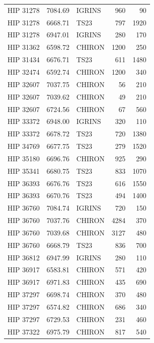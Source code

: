 \begin{scriptsize}
\begin{longtable}{|l|rlrr|}
   HIP 31278 &  7084.69 &     IGRINS &      960 &    90 \\
   HIP 31278 &  6668.71 &       TS23 &      797 &  1920 \\
   HIP 31278 &  6947.01 &     IGRINS &      280 &   170 \\
   HIP 31362 &  6598.72 &     CHIRON &     1200 &   250 \\
   HIP 31434 &  6676.71 &       TS23 &      611 &  1480 \\
   HIP 32474 &  6592.74 &     CHIRON &     1200 &   340 \\
   HIP 32607 &  7037.75 &     CHIRON &       56 &   210 \\
   HIP 32607 &  7039.62 &     CHIRON &       49 &   210 \\
   HIP 32607 &  6724.56 &     CHIRON &       67 &   560 \\
   HIP 33372 &  6948.00 &     IGRINS &      320 &   110 \\
   HIP 33372 &  6678.72 &       TS23 &      720 &  1380 \\
   HIP 34769 &  6677.75 &       TS23 &      279 &  1520 \\
   HIP 35180 &  6696.76 &     CHIRON &      925 &   290 \\
   HIP 35341 &  6680.75 &       TS23 &      833 &  1070 \\
   HIP 36393 &  6676.76 &       TS23 &      616 &  1550 \\
   HIP 36393 &  6670.76 &       TS23 &      494 &  1400 \\
   HIP 36760 &  7084.74 &     IGRINS &      720 &   150 \\
   HIP 36760 &  7037.76 &     CHIRON &     4284 &   370 \\
   HIP 36760 &  7039.68 &     CHIRON &     3127 &   480 \\
   HIP 36760 &  6668.79 &       TS23 &      836 &   700 \\
   HIP 36812 &  6947.99 &     IGRINS &      280 &   110 \\
   HIP 36917 &  6583.81 &     CHIRON &      571 &   420 \\
   HIP 36917 &  6971.83 &     CHIRON &      435 &   690 \\
   HIP 37297 &  6698.74 &     CHIRON &      370 &   480 \\
   HIP 37297 &  6574.82 &     CHIRON &      686 &   340 \\
   HIP 37297 &  6729.53 &     CHIRON &      231 &   460 \\
   HIP 37322 &  6975.79 &     CHIRON &      817 &   540 \\

\end{longtable}
\end{scriptsize}
